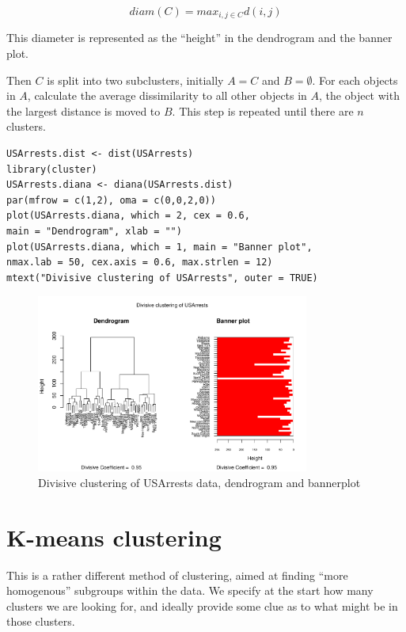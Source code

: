 \begin{displaymath}
diam(C) = max_{i,j \in C} d(i,j)
\end{displaymath}

This diameter is represented as the ``height'' in the dendrogram and the banner plot.

Then $C$ is split into two subclusters, initially $A=C$ and $B=\emptyset$.   For each objects in $A$, calculate the average dissimilarity to all other objects in $A$, the object with the largest distance is moved to $B$.   This step is repeated until there are $n$ clusters. 



\singlespacing
\begin{verbatim}
USArrests.dist <- dist(USArrests)
library(cluster)
USArrests.diana <- diana(USArrests.dist)
par(mfrow = c(1,2), oma = c(0,0,2,0))
plot(USArrests.diana, which = 2, cex = 0.6, 
main = "Dendrogram", xlab = "")
plot(USArrests.diana, which = 1, main = "Banner plot", 
nmax.lab = 50, cex.axis = 0.6, max.strlen = 12)
mtext("Divisive clustering of USArrests", outer = TRUE)
\end{verbatim}
\onehalfspacing




\begin{figure}
\begin{center}
\includegraphics[width = 0.8\textwidth]{images/diana}
\caption{Divisive clustering of USArrests data, dendrogram and bannerplot}
\label{diana}
\end{center}
\end{figure}


\section{K-means clustering}
\label{kmclust}

This is a rather different method of clustering, aimed at finding ``more homogenous'' subgroups within the data.   We specify at the start how many clusters we are looking for, and ideally provide some clue as to what might be in those clusters.

